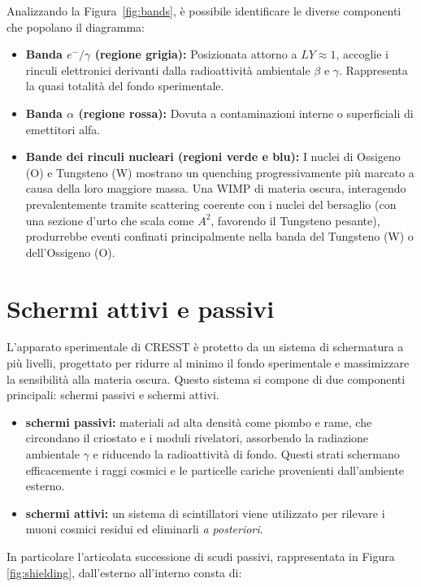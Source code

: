 Analizzando la Figura~\ref{fig:bands}, è possibile identificare le diverse componenti che popolano il diagramma:
\begin{itemize}
    \item \textbf{Banda $e^-/\gamma$ (regione grigia):} Posizionata attorno a $LY \approx 1$, accoglie i rinculi elettronici derivanti dalla radioattività ambientale $\beta$ e $\gamma$. Rappresenta la quasi totalità del fondo sperimentale.
    \item \textbf{Banda $\alpha$ (regione rossa):} Dovuta a contaminazioni interne o superficiali di emettitori alfa.
    \item \textbf{Bande dei rinculi nucleari (regioni verde e blu):} I nuclei di Ossigeno (O) e Tungsteno (W) mostrano un quenching progressivamente più marcato a causa della loro maggiore massa. Una WIMP di materia oscura, interagendo prevalentemente tramite scattering coerente con i nuclei del bersaglio (con una sezione d'urto che scala come $A^2$, favorendo il Tungsteno pesante), produrrebbe eventi confinati principalmente nella banda del Tungsteno (W) o dell'Ossigeno (O).
\end{itemize}

\section{Schermi attivi e passivi}
\label{sec:scudi}

L'apparato sperimentale di CRESST è protetto da un sistema di schermatura a più livelli, progettato per ridurre al minimo il fondo sperimentale e massimizzare la sensibilità alla materia oscura. Questo sistema si compone di due componenti principali: schermi passivi e schermi attivi.

\begin{itemize}
    \item \textbf{schermi passivi:} materiali ad alta densità come piombo e rame, che circondano il criostato e i moduli rivelatori, assorbendo la radiazione ambientale $\gamma$ e riducendo la radioattività di fondo. Questi strati schermano efficacemente i raggi cosmici e le particelle cariche provenienti dall'ambiente esterno.
    \item \textbf{schermi attivi:} un sistema di scintillatori viene utilizzato per rilevare i muoni cosmici residui ed eliminarli \textit{a posteriori}.
\end{itemize}

In particolare l'articolata successione di scudi passivi, rappresentata in Figura \ref{fig:shielding}, dall'esterno all'interno consta di:

